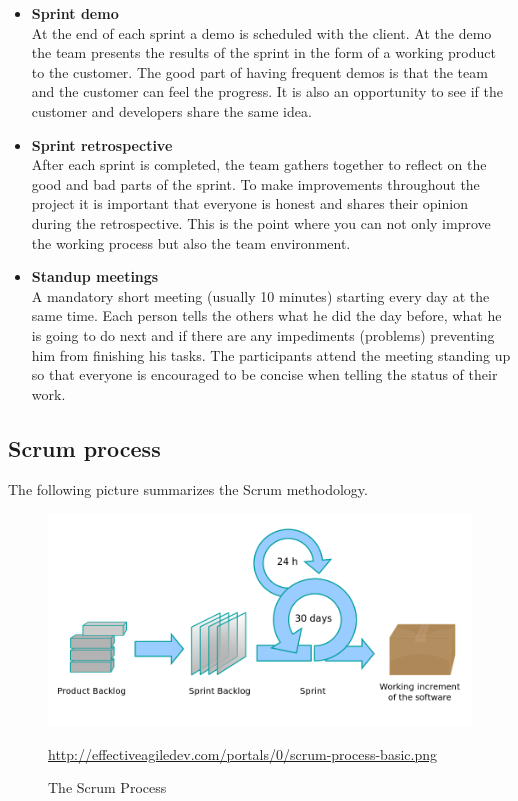 \begin{itemize}
\item{\textbf{Sprint demo}}\\
At the end of each sprint a demo is scheduled with the client. At the demo the team presents the results of the sprint 
in the form of a working product to the customer. The good part of having frequent demos is that the team and the customer can
feel the progress. It is also an opportunity to see if the customer and developers share the same idea.

\item{\textbf{Sprint retrospective}}\\
After each sprint is completed, the team gathers together to reflect on the good and bad parts of the sprint.
To make improvements throughout the project it is important that everyone is honest and shares their opinion during the retrospective.
This is the point where you can not only improve the working process but also the team environment.

\item{\textbf{Standup meetings}}\\
A mandatory short meeting (usually 10 minutes) starting every day at the same time.
Each person tells the others what he did the day before, what he is going to do
next and if there are any impediments (problems) preventing him from finishing his tasks. The participants attend the meeting standing up so that everyone is encouraged to be concise
when telling the status of their work.

\end{itemize}
\pagebreak

\subsection{Scrum process}
The following picture summarizes the Scrum methodology.

\begin{figure}[!h]
  \centering
  \includegraphics[scale=0.35]{graphics/scrum.png}
  \caption{The Scrum Process\cite{imageScrum}}
  \label{fig:scrum_process}
  \url{http://effectiveagiledev.com/portals/0/scrum-process-basic.png}
\end{figure}
